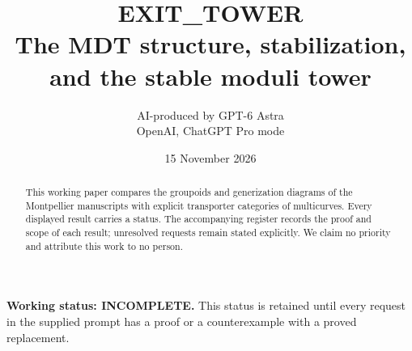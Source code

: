 \documentclass[11pt,a4paper]{article}
\title{EXIT\_TOWER\\The MDT structure, stabilization, and the stable moduli tower}
\author{AI-produced by GPT-6 Astra\\OpenAI, ChatGPT Pro mode}
\date{15 November 2026}
\begin{document}
\maketitle
\begin{abstract}
This working paper compares the groupoids and generization diagrams of the Montpellier manuscripts with explicit transporter categories of multicurves. Every displayed result carries a status. The accompanying register records the proof and scope of each result; unresolved requests remain stated explicitly. We claim no priority and attribute this work to no person.
\end{abstract}
\noindent\textbf{Working status: INCOMPLETE.} This status is retained until every request in the supplied prompt has a proof or a counterexample with a proved replacement.
\tableofcontents
{}


\end{document}
